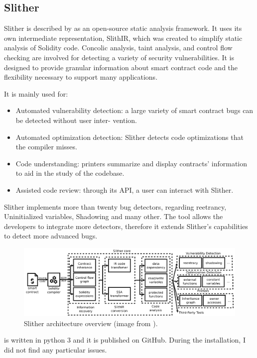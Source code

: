 \subsection{Slither}
\label{sec:WithoutSpecification:Slither}
Slither is described by \citet{Slither} as an open-source static analysis framework.
It uses its own intermediate representation, SlithIR, which was created to simplify static analysis of Solidity code. 
Concolic analysis, taint analysis, and control flow checking are involved for detecting a variety
of security vulnerabilities. It is designed to provide
granular information about smart contract code and the flexibility necessary to support many applications.

It is mainly used for:
\begin{itemize}
    \item Automated vulnerability detection: a large variety of
    smart contract bugs can be detected without user inter-
    vention.
    \item Automated optimization detection: Slither detects code
    optimizations that the compiler misses.
    \item Code understanding: printers summarize and display
    contracts' information to aid in the study of the codebase.
    \item Assisted code review: through its API, a user can interact
    with Slither.
\end{itemize}

Slither implements more than twenty bug detectors, regarding reetrancy, Uninitialized variables,
Shadowing and many other. The tool allows the developers to integrate more detectors, therefore it extends Slither's capabilities
to detect more advanced bugs.

\begin{figure}
    \centering
    \includegraphics[width=13cm]{logos/SlitherArchitecture.png}
    \caption{Slither architecture overview (image from \cite{Slither}).}
    \label{fig:slitherarch}
\end{figure}


\citet{SlitherGitHub} is written in python 3 and it is published on GitHub.
During the installation, I did not find any particular issues.

